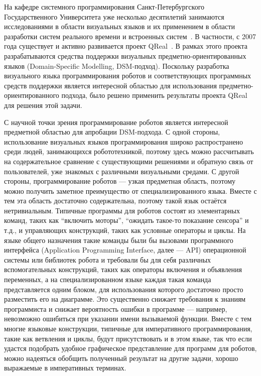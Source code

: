 \documentclass[a4paper]{article}
\begin{document}
На кафедре системного программирования Санкт-Петербургского Государственного Университета уже несколько десятилетий занимаются исследованиями в области визуальных языков и их применением в области разработки систем реального времени и встроенных систем~\cite{rtst1, rtst2, rtst3, videoDsl, dsmPlatforms, real1, real2, student1, student2, msfDsm, msfDsm2}. В частности, с 2007 года существует и активно развивается проект QReal~\cite{qReal}. В рамках этого проекта разрабатываются средства поддержки визуальных предметно-ориентированных языков (Domain-Specific Modelling, DSM-подход). Поскольку разработка визуального языка программирования роботов и соответствующих программных средств поддержки является интересной областью для использования предметно-ориентированного подхода, было решено применить результаты проекта QReal для решения этой задачи.  

С научной точки зрения программирование роботов является интересной предметной областью для апробации DSM-подхода. С одной стороны, использование визуальных языков программирования широко распространено среди людей, занимающихся робототехникой, поэтому здесь можно рассчитывать на содержательное сравнение с существующими решениями и обратную связь от пользователей, уже знакомых с различными визуальными средами. С другой стороны, программирование роботов --- узкая предметная область, поэтому можно получить заметное преимущество от специализированного языка. Вместе с тем эта область достаточно содержательна, поэтому такой язык остаётся нетривиальным. Типичные программы для роботов состоят из элементарных команд, таких как ``включить моторы'', ``ожидать такое-то показание сенсора'' и т.д., и управляющих конструкций, таких как условные операторы и циклы. На языке общего назначения такие команды были бы вызовами программного интерфейса (Application Programming Interface, далее --- API) операционной системы или библиотек робота и требовали бы для себя различных вспомогательных конструкций, таких как операторы включения и объявления переменных, а на специализированном языке каждая такая команда представляется одним блоком, для использования которого достаточно просто разместить его на диаграмме. Это существенно снижает требования к знаниям программиста и снижает вероятность ошибки в программе --- например, невозможно ошибиться при указании имени вызываемой функции. Вместе с тем многие языковые конструкции, типичные для императивного программирования, такие как ветвления и циклы, будут присутствовать и в этом языке, так что если удастся подобрать удобное графическое представление для программ для роботов, можно надеяться обобщить полученный результат на другие задачи, хорошо выражаемые в императивных терминах.
\end{document}
